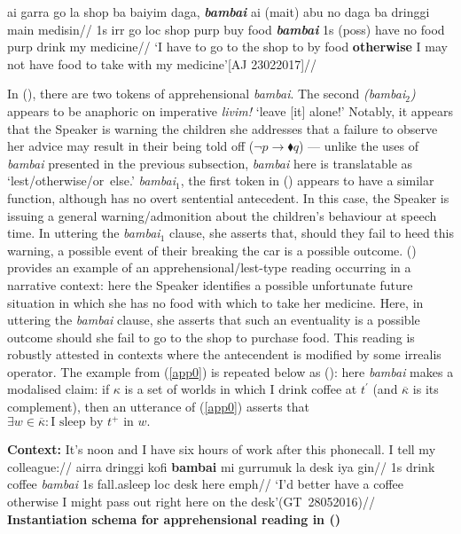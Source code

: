 \documentclass[11pt]{article}
\begin{document}
\a{}\begingl\gla ai garra go la shop ba baiyim daga, \textbf{\textit{bambai}} ai (mait) abu no daga ba dringgi main medisin//
\glb 1s {\sc irr} go {\sc loc} shop {\sc purp} buy food \textit{\textbf{bambai}} 1s {\sc(poss)} have no food {\sc purp} drink my medicine//
\glft `I have to go to the shop to by food \textbf{otherwise} I may not have food to take with my medicine'\hspace*{\fill}[AJ 23022017]//
\endgl\xe

In (), there are two tokens of apprehensional \textit{bambai}. The second \textit{(bambai$_2$)} appears to be anaphoric on imperative \textit{livim!} `leave [it] alone!' Notably, it appears that the Speaker is warning the children she addresses that a failure to observe her advice may result in their being told off ($\neg p\to\blacklozenge q$) --- unlike the uses of \textit{bambai} presented in the previous subsection, \textit{bambai} here is translatable as `lest/otherwise/or~else.' \textit{bambai$_1$}, the first token in () appears to have a similar function, although has no overt sentential antecedent. In this case, the Speaker is issuing a general warning/admonition about the children's behaviour at speech time. In uttering the \textit{bambai$_1$} clause, she asserts that, should they fail to heed this warning, a possible event of their breaking the car is a possible outcome. () provides an example of an apprehensional/{\sc lest}-type reading occurring in a narrative context: here the Speaker identifies a possible unfortunate future situation in which she has no food with which to take her medicine. Here, in uttering the \textit{bambai} clause, she asserts that such an eventuality is a possible outcome should she fail to go to the shop to purchase food. This reading is robustly attested in contexts where the antecendent is modified by some irrealis operator. The example from (\ref{app0}) is repeated below as (\nextx): here \textit{bambai} makes a modalised claim: if $\kappa$ is a set of worlds in which I drink coffee at $t^\prime$ (and $\overline{\kappa}$ is its complement), then an utterance of (\ref{app0}) asserts that $\exists w\in\overline{\kappa}:\text{I sleep by }t^+\text{ in }w.$

\pex\a{}\begingl
\glpreamble\textbf{Context:}  It's noon and I have six hours of work after this phonecall. I tell my colleague://
\gla ai\textdblhyphen{}rra dringgi kofi \textbf{bambai} mi gurrumuk la desk iya gin//
\glb 1s drink coffee \textit{bambai} 1s fall.asleep {\sc loc} desk here {\sc emph}//
\glft `I'd better have a coffee otherwise I might pass out right here on the desk'\hfill(GT~28052016)//
\endgl\vspace{.5cm}
\a \textup{\textbf{Instantiation schema for apprehensional reading in ()}}
\end{document}
